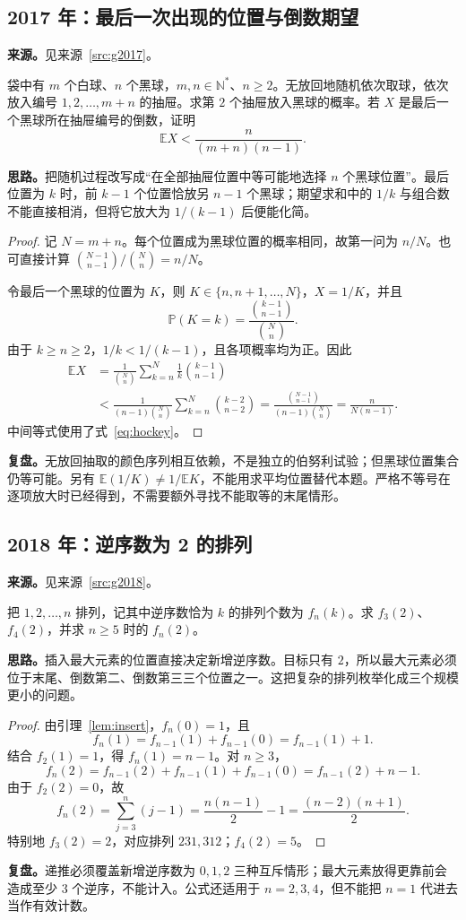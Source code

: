 \documentclass[UTF8,12pt,a4paper,fontset=fandol]{ctexart}
\begin{document}
\subsection{2017 年：最后一次出现的位置与倒数期望}\label{sec:g2017}
\textbf{来源。}见来源~\ref{src:g2017}。
\begin{example}[题意重述]
袋中有 $m$ 个白球、$n$ 个黑球，$m,n\in\mathbb N^*$、$n\geq2$。无放回地随机依次取球，依次放入编号 $1,2,\ldots,m+n$ 的抽屉。求第 $2$ 个抽屉放入黑球的概率。若 $X$ 是最后一个黑球所在抽屉编号的倒数，证明
\[
\mathbb E X<\frac{n}{(m+n)(n-1)}.
\]
\end{example}
\textbf{思路。}把随机过程改写成“在全部抽屉位置中等可能地选择 $n$ 个黑球位置”。最后位置为 $k$ 时，前 $k-1$ 个位置恰放另 $n-1$ 个黑球；期望求和中的 $1/k$ 与组合数不能直接相消，但将它放大为 $1/(k-1)$ 后便能化简。
\begin{proof}
记 $N=m+n$。每个位置成为黑球位置的概率相同，故第一问为 $n/N$。也可直接计算 $\binom{N-1}{n-1}/\binom Nn=n/N$。

令最后一个黑球的位置为 $K$，则 $K\in\{n,n+1,\ldots,N\}$，$X=1/K$，并且
\[
\mathbb P(K=k)=\frac{\binom{k-1}{n-1}}{\binom Nn}.
\]
由于 $k\geq n\geq2$，$1/k<1/(k-1)$，且各项概率均为正。因此
\begin{align*}
\mathbb E X
&=\frac1{\binom Nn}\sum_{k=n}^{N}\frac1k\binom{k-1}{n-1}\\
&<\frac1{(n-1)\binom Nn}\sum_{k=n}^{N}\binom{k-2}{n-2}
=\frac{\binom{N-1}{n-1}}{(n-1)\binom Nn}
=\frac n{N(n-1)}.
\end{align*}
中间等式使用了式~\eqref{eq:hockey}。
\end{proof}
\textbf{复盘。}无放回抽取的颜色序列相互依赖，不是独立的伯努利试验；但黑球位置集合仍等可能。另有 $\mathbb E(1/K)\ne1/\mathbb E K$，不能用求平均位置替代本题。严格不等号在逐项放大时已经得到，不需要额外寻找不能取等的末尾情形。

\subsection{2018 年：逆序数为 2 的排列}\label{sec:g2018}
\textbf{来源。}见来源~\ref{src:g2018}。
\begin{example}[题意重述]
把 $1,2,\ldots,n$ 排列，记其中逆序数恰为 $k$ 的排列个数为 $f_n(k)$。求 $f_3(2)$、$f_4(2)$，并求 $n\geq5$ 时的 $f_n(2)$。
\end{example}
\textbf{思路。}插入最大元素的位置直接决定新增逆序数。目标只有 $2$，所以最大元素必须位于末尾、倒数第二、倒数第三三个位置之一。这把复杂的排列枚举化成三个规模更小的问题。
\begin{proof}
由引理~\ref{lem:insert}，$f_n(0)=1$，且
\[
f_n(1)=f_{n-1}(1)+f_{n-1}(0)=f_{n-1}(1)+1.
\]
结合 $f_2(1)=1$，得 $f_n(1)=n-1$。对 $n\geq3$，
\[
f_n(2)=f_{n-1}(2)+f_{n-1}(1)+f_{n-1}(0)
=f_{n-1}(2)+n-1.
\]
由于 $f_2(2)=0$，故
\[
f_n(2)=\sum_{j=3}^{n}(j-1)=\frac{n(n-1)}2-1
=\frac{(n-2)(n+1)}2.
\]
特别地 $f_3(2)=2$，对应排列 $231,312$；$f_4(2)=5$。
\end{proof}
\textbf{复盘。}递推必须覆盖新增逆序数为 $0,1,2$ 三种互斥情形；最大元素放得更靠前会造成至少 $3$ 个逆序，不能计入。公式还适用于 $n=2,3,4$，但不能把 $n=1$ 代进去当作有效计数。
\end{document}
